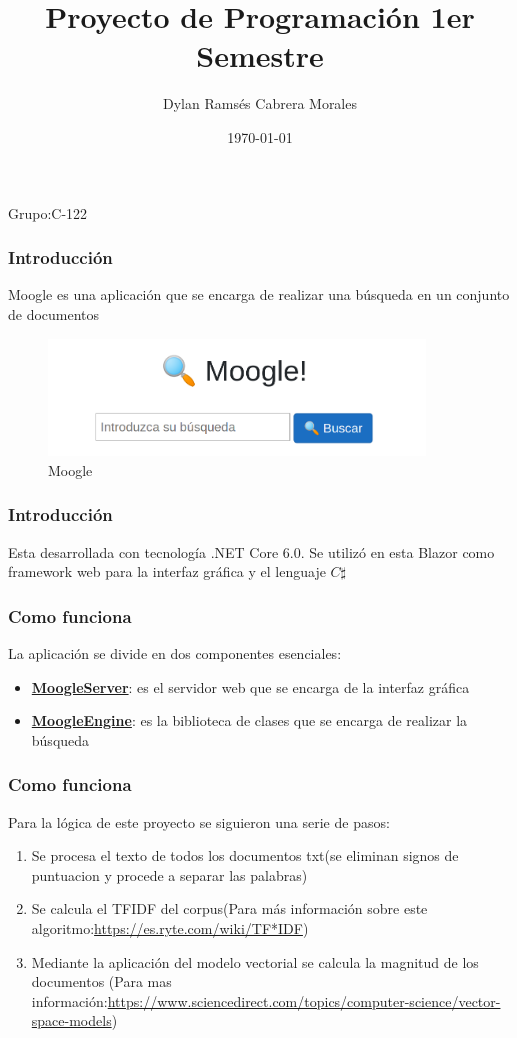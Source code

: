 \documentclass{beamer}
\title{Proyecto de Programación 1er Semestre}
\author{Dylan Ramsés Cabrera Morales}
\date{\today}
\begin{document}
\begin{frame}
\maketitle
\begin{center}
\small{Grupo:C-122}
\end{center}
\end{frame}
\begin{frame}
\frametitle{Introducción}
Moogle es una aplicación que se encarga de realizar una búsqueda en un conjunto de documentos
\begin{figure}[h]
\centering
\includegraphics[width = 10cm]{moogle.png}
\caption{Moogle}
\label{fig:1}    
\end{figure}   
\end{frame}
\begin{frame}
\frametitle{Introducción}
Esta desarrollada con tecnología .NET Core 6.0. Se utilizó en esta Blazor como framework web
para la interfaz gráfica y el lenguaje $C\sharp$    
\end{frame}
\begin{frame}
\frametitle{Como funciona}
La aplicación se divide en dos componentes esenciales:
\begin{itemize}
    \item \underline{\textbf{MoogleServer}}: es el servidor web que se encarga de la interfaz gráfica
    \item \underline{\textbf{MoogleEngine}}: es la biblioteca de clases que se encarga de realizar la
    búsqueda
\end{itemize}
\end{frame}
\begin{frame}
\frametitle{Como funciona}
Para la lógica de este proyecto se siguieron una serie de pasos:
\begin{enumerate}
    \item Se procesa el texto de todos los documentos txt(se eliminan signos de puntuacion y procede
    a separar las palabras)
    \item Se calcula el TFIDF del corpus(Para más información sobre este algoritmo:\url{https://es.ryte.com/wiki/TF*IDF})
    \item Mediante la aplicación del modelo vectorial se calcula la magnitud de los documentos
    (Para mas información:\url{https://www.sciencedirect.com/topics/computer-science/vector-space-models})
\end{enumerate}
\end{frame}
\end{document}
